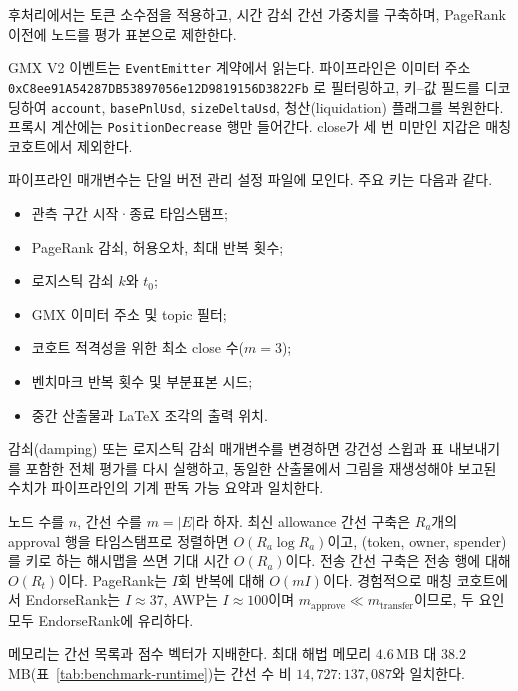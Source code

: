 후처리에서는 토큰 소수점을 적용하고, 시간 감쇠 간선 가중치를 구축하며, PageRank 이전에 노드를 평가 표본으로 제한한다.


GMX V2 이벤트는 \texttt{EventEmitter} 계약에서 읽는다. 파이프라인은 이미터 주소
\texttt{0xC8ee91A54287DB53897056e12D9819156D3822Fb}
로 필터링하고, 키--값 필드를 디코딩하여 \texttt{account}, \texttt{basePnlUsd}, \texttt{sizeDeltaUsd}, 청산(liquidation) 플래그를 복원한다. 프록시 계산에는 \texttt{PositionDecrease} 행만 들어간다. close가 세 번 미만인 지갑은 매칭 코호트에서 제외한다.


파이프라인 매개변수는 단일 버전 관리 설정 파일에 모인다. 주요 키는 다음과 같다.

\begin{itemize}
\item 관측 구간 시작·종료 타임스탬프;
\item PageRank 감쇠, 허용오차, 최대 반복 횟수;
\item 로지스틱 감쇠 $k$와 $t_0$;
\item GMX 이미터 주소 및 topic 필터;
\item 코호트 적격성을 위한 최소 close 수($m=3$);
\item 벤치마크 반복 횟수 및 부분표본 시드;
\item 중간 산출물과 LaTeX 조각의 출력 위치.
\end{itemize}

감쇠(damping) 또는 로지스틱 감쇠 매개변수를 변경하면 강건성 스윕과 표 내보내기를 포함한 전체 평가를 다시 실행하고, 동일한 산출물에서 그림을 재생성해야 보고된 수치가 파이프라인의 기계 판독 가능 요약과 일치한다.


노드 수를 $n$, 간선 수를 $m=|E|$라 하자. 최신 allowance 간선 구축은 $R_a$개의 approval 행을 타임스탬프로 정렬하면 $O(R_a\log R_a)$이고, (token, owner, spender)를 키로 하는 해시맵을 쓰면 기대 시간 $O(R_a)$이다. 전송 간선 구축은 전송 행에 대해 $O(R_t)$이다. PageRank는 $I$회 반복에 대해 $O(mI)$이다. 경험적으로 매칭 코호트에서 EndorseRank는 $I\approx 37$, AWP는 $I\approx 100$이며 $m_{\mathrm{approve}}\ll m_{\mathrm{transfer}}$이므로, 두 요인 모두 EndorseRank에 유리하다.

메모리는 간선 목록과 점수 벡터가 지배한다. 최대 해법 메모리 $4.6$\,MB 대 $38.2$\,MB(표~\ref{tab:benchmark-runtime})는 간선 수 비 $14{,}727:137{,}087$와 일치한다.

